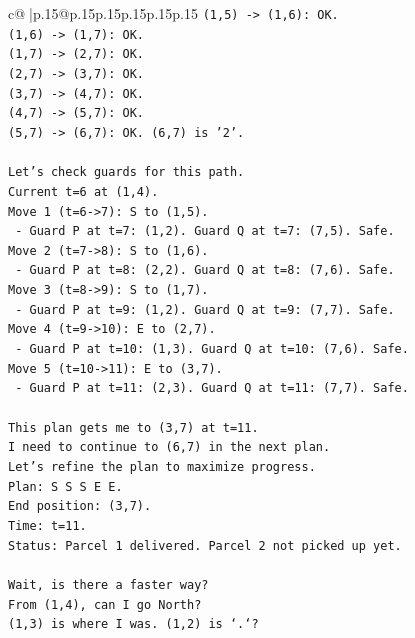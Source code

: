 \documentclass{article}
\begin{document}
{\begin{supertabular}{c@{$\;$}|p{.15\linewidth}@{}p{.15\linewidth}p{.15\linewidth}p{.15\linewidth}p{.15\linewidth}p{.15\linewidth}}
{{{\texttt{(1,5) {-}> (1,6): OK.} \\
\texttt{(1,6) {-}> (1,7): OK.} \\
\texttt{(1,7) {-}> (2,7): OK.} \\
\texttt{(2,7) {-}> (3,7): OK.} \\
\texttt{(3,7) {-}> (4,7): OK.} \\
\texttt{(4,7) {-}> (5,7): OK.} \\
\texttt{(5,7) {-}> (6,7): OK. (6,7) is '2'.} \\
\\ 
\texttt{Let's check guards for this path.} \\
\texttt{Current t=6 at (1,4).} \\
\texttt{Move 1 (t=6{-}>7): S to (1,5).} \\
\texttt{  {-} Guard P at t=7: (1,2). Guard Q at t=7: (7,5). Safe.} \\
\texttt{Move 2 (t=7{-}>8): S to (1,6).} \\
\texttt{  {-} Guard P at t=8: (2,2). Guard Q at t=8: (7,6). Safe.} \\
\texttt{Move 3 (t=8{-}>9): S to (1,7).} \\
\texttt{  {-} Guard P at t=9: (1,2). Guard Q at t=9: (7,7). Safe.} \\
\texttt{Move 4 (t=9{-}>10): E to (2,7).} \\
\texttt{  {-} Guard P at t=10: (1,3). Guard Q at t=10: (7,6). Safe.} \\
\texttt{Move 5 (t=10{-}>11): E to (3,7).} \\
\texttt{  {-} Guard P at t=11: (2,3). Guard Q at t=11: (7,7). Safe.} \\
\\ 
\texttt{This plan gets me to (3,7) at t=11.} \\
\texttt{I need to continue to (6,7) in the next plan.} \\
\texttt{Let's refine the plan to maximize progress.} \\
\texttt{Plan: S S S E E.} \\
\texttt{End position: (3,7).} \\
\texttt{Time: t=11.} \\
\texttt{Status: Parcel 1 delivered. Parcel 2 not picked up yet.} \\
\\ 
\texttt{Wait, is there a faster way?} \\
\texttt{From (1,4), can I go North?} \\
\texttt{(1,3) is where I was. (1,2) is `.`?} \\
}}}
\end{supertabular}}
\end{document}

